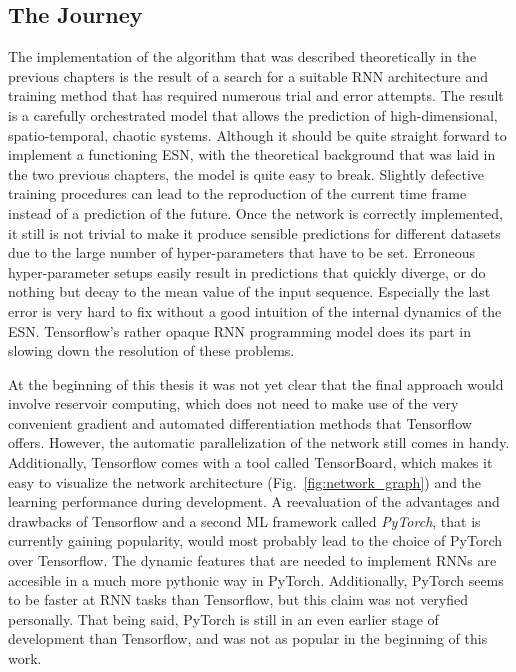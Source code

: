 \subsection{The Journey}%
\label{sub:the_journey}
The implementation of the algorithm that was described theoretically in the
previous chapters is the result of a search for a suitable RNN architecture and
training method that has required numerous trial and error attempts.  The
result is a carefully orchestrated model that allows the prediction of
high-dimensional, spatio-temporal, chaotic systems. Although it should be quite
straight forward to implement a functioning ESN, with the theoretical
background that was laid in the two previous chapters, the model is quite
easy to break. Slightly defective training procedures can lead to the
reproduction of the current time frame instead of a prediction of the future.
Once the network is correctly implemented, it still is not trivial to make it
produce sensible predictions for different datasets due to the large number of
hyper-parameters that have to be set.  Erroneous hyper-parameter setups easily
result in predictions that quickly diverge, or do nothing but decay to the mean
value of the input sequence.  Especially the last error is very hard to fix
without a good intuition of the internal dynamics of the ESN.  Tensorflow's
rather opaque RNN programming model does its part in slowing down the
resolution of these problems.

At the beginning of this thesis it was not yet clear that the final approach
would involve reservoir computing, which does not need to make use of the very
convenient gradient and automated differentiation methods that Tensorflow
offers. However, the automatic parallelization of the network still comes in
handy. Additionally, Tensorflow comes with a tool called TensorBoard, which
makes it easy to visualize the network architecture
(Fig.~\ref{fig:network_graph}) and the learning performance during development.
A reevaluation of the advantages and drawbacks of Tensorflow and a second ML
framework called \emph{PyTorch}, that is currently gaining popularity, would
most probably lead to the choice of PyTorch over Tensorflow.  The dynamic
features that are needed to implement RNNs are accesible in a much more
pythonic way in PyTorch. Additionally, PyTorch seems to be faster at RNN tasks
than Tensorflow, but this claim was not veryfied personally. That being said,
PyTorch is still in an even earlier stage of development than Tensorflow, and
was not as popular in the beginning of this work.\\




